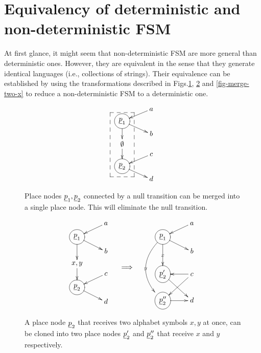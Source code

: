 \section{Equivalency of deterministic and non-deterministic FSM}

At first glance, it might
seem that non-deterministic FSM
are more general than  deterministic ones.
However, they are equivalent
in the sense that they generate identical languages (i.e., collections of strings). Their equivalence can be
established by using the transformations described in Figs.\ref{fig-shrink-null-tra},
\ref{fig-split-x-y}
and \ref{fig-merge-two-x}
to reduce  a non-deterministic FSM
to a deterministic one.


\begin{figure}[h!]
$$
\xymatrix@R=.1pc{
& a\ar[dl]
\\
\Circle{\rvp_1}\ar[rd]
\ar[dd]
\\
& b
\\
\emptyset\ar[dd]
\\
&c\ar[dl]
\\
\Circle{\rvp_2}\ar[rd]
\\
&d
\save "2,1"."6,1"*++[F--]\frm{}
\restore
}
$$
\caption{Place nodes $\rvp_1, \rvp_2$ connected by
a null transition can be merged into a single
place node. This will eliminate the null transition.}
\label{fig-shrink-null-tra}
\end{figure}

\begin{figure}[h!]
$$
\begin{array}{ccc}
\xymatrix@R=.3pc{
& a\ar[dl]
\\
\Circle{\rvp_1}\ar[rd]
\ar[dd]
\\
& b
\\
x,y\ar[dd]
\\
&c\ar[dl]
\\
\Circle{\rvp_2}\ar[rd]
\\
&d
}
&
\xymatrix
{
\\
\\
\implies}
&
\xymatrix@R=.3pc{
& a\ar[dl]
\\
\Circle{\rvp_1}\ar[rd]
\ar[ddd]|x
\ar@/_2pc/[ddddd]|y
\\
& b
\\
\\
\Circle{\rvp_2'}\ar[rdd]
&c\ar[ldd]\ar[l]
\\
\\
\Circle{\rvp_2''}\ar[r]
&d
}
\end{array}
$$
\caption{A place node $\rvp_2$
that receives two alphabet 
symbols $x, y$ at once, 
can be cloned into two place nodes
$\rvp_2'$ and $\rvp_2''$ that receive
 $x$ and $y$ respectively.
}
\label{fig-split-x-y}
\end{figure}


